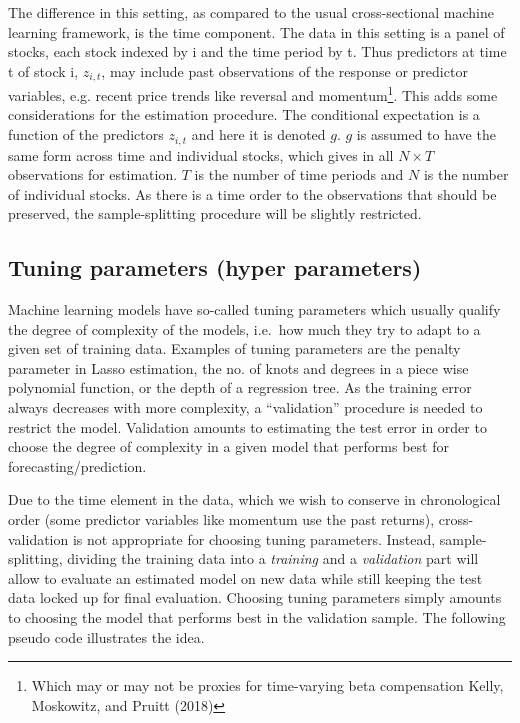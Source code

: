\documentclass[11pt]{article}
\let\rmarkdownfootnote\footnote%
\def\footnote{\protect\rmarkdownfootnote}
\begin{document}
The difference in this setting, as compared to the usual cross-sectional
machine learning framework, is the time component. The data in this
setting is a panel of stocks, each stock indexed by i and the time
period by t. Thus predictors at time t of stock i, \(z_{i,t}\), may
include past observations of the response or predictor variables, e.g.
recent price trends like reversal and momentum\footnote{Which may or may
not be proxies for time-varying beta compensation Kelly, Moskowitz,
and Pruitt (2018)}. This adds some considerations for the estimation
procedure. The conditional expectation is a function of the predictors
\(z_{i,t}\) and here it is denoted \(g\). \(g\) is assumed to have the
same form across time and individual stocks, which gives in all
\(N\times T\) observations for estimation. \(T\) is the number of
time periods and \(N\) is the number of individual stocks. As
there is a time order to the observations that should be preserved, the sample-splitting procedure will be slightly restricted.

\hypertarget{tuning-parameters-hyper-parameters}{%
\subsection{Tuning parameters (hyper
parameters)}\label{tuning-parameters-hyper-parameters}}

Machine learning models have so-called tuning parameters which usually
qualify the degree of complexity of the models, i.e.~how much they try
to adapt to a given set of training data. Examples of tuning parameters
are the penalty parameter in Lasso estimation, the no. of knots and
degrees in a piece wise polynomial function, or the depth of a
regression tree. As the training error always decreases with more
complexity, a ``validation'' procedure is needed to restrict the model.
Validation amounts to estimating the test error in order to choose the
degree of complexity in a given model that performs best for
forecasting/prediction.

Due to the time element in the data, which we wish to conserve in
chronological order (some predictor variables like momentum use the past
returns), cross-validation is not appropriate for choosing tuning
parameters. Instead, sample-splitting, dividing the training data into a
\emph{training} and a \emph{validation} part will allow to evaluate an
estimated model on new data while still keeping the test data locked up
for final evaluation. Choosing tuning parameters simply amounts to
choosing the model that performs best in the validation sample. The
following pseudo code illustrates the idea.
\end{document}
